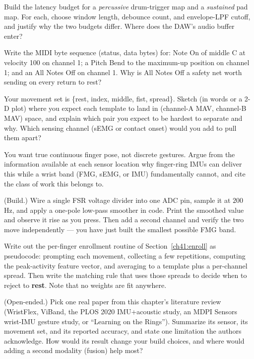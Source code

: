 \begin{exercise}
Build the latency budget for a \emph{percussive} drum-trigger map and a
\emph{sustained} pad map. For each, choose window length, debounce count, and
envelope-LPF cutoff, and justify why the two budgets differ. Where does the
DAW's audio buffer enter?
\end{exercise}

\begin{exercise}
Write the MIDI byte sequence (status, data bytes) for: Note On of middle C at
velocity 100 on channel 1; a Pitch Bend to the maximum-up position on channel 1;
and an All Notes Off on channel 1. Why is All Notes Off a safety net worth
sending on every return to rest?
\end{exercise}

\begin{exercise}
Your movement set is \{rest, index, middle, fist, spread\}. Sketch (in words or
a 2-D plot) where you expect each template to land in (channel-A MAV, channel-B
MAV) space, and explain which pair you expect to be hardest to separate and why.
Which sensing channel (sEMG or contact onset) would you add to pull them apart?
\end{exercise}

\begin{exercise}
You want true continuous finger pose, not discrete gestures. Argue from the
information available at each sensor location why finger-ring IMUs can deliver
this while a wrist band (FMG, sEMG, or IMU) fundamentally cannot, and cite the
class of work this belongs to.
\end{exercise}

\begin{exercise}
(Build.) Wire a single FSR voltage divider into one ADC pin, sample it at
$200\,$Hz, and apply a one-pole low-pass smoother in code. Print the smoothed
value and observe it rise as you press. Then add a second channel and verify the
two move independently --- you have just built the smallest possible FMG band.
\end{exercise}

\begin{exercise}
Write out the per-finger enrollment routine of Section~\ref{ch41:enroll} as
pseudocode: prompting each movement, collecting a few repetitions, computing the
peak-activity feature vector, and averaging to a template plus a per-channel
spread. Then write the matching rule that uses those spreads to decide when to
reject to \textbf{rest}. Note that no weights are fit anywhere.
\end{exercise}

\begin{exercise}
(Open-ended.) Pick one real paper from this chapter's literature review (WristFlex,
ViBand, the PLOS 2020 IMU+acoustic study, an MDPI Sensors wrist-IMU gesture
study, or ``Learning on the Rings''). Summarize its sensor, its movement set, and
its reported accuracy, and state one limitation the authors acknowledge. How
would its result change your build choices, and where would adding a second
modality (fusion) help most?
\end{exercise}
